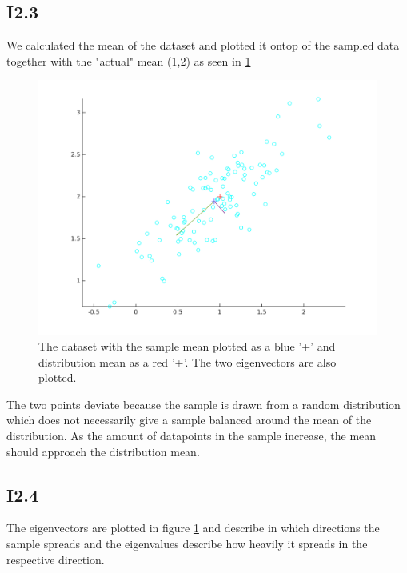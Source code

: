 \documentclass{article}
\begin{document}
\subsection{I2.3}


We calculated the mean of the dataset and plotted it ontop of the sampled
data together with the "actual" mean (1,2) as seen in \ref{fig:I3.1}

\begin{figure}[!ht]
    \centering
    \includegraphics[width=\textwidth]{part1/I231.png}
    \caption{The dataset with the sample mean plotted as a blue '+' and
    distribution mean as a red '+'. The two eigenvectors are also plotted.}
    \label{fig:I3.1}
\end{figure}

The two points deviate because the sample is drawn from a random
distribution which does not necessarily give a sample balanced around the
mean of the distribution. As the amount of datapoints in the sample
increase, the mean should approach the distribution mean.


\subsection{I2.4}

The eigenvectors are plotted in figure \ref{fig:I3.1} and describe in which
directions the sample spreads and the eigenvalues describe how heavily it
spreads in the respective direction.
\end{document}
